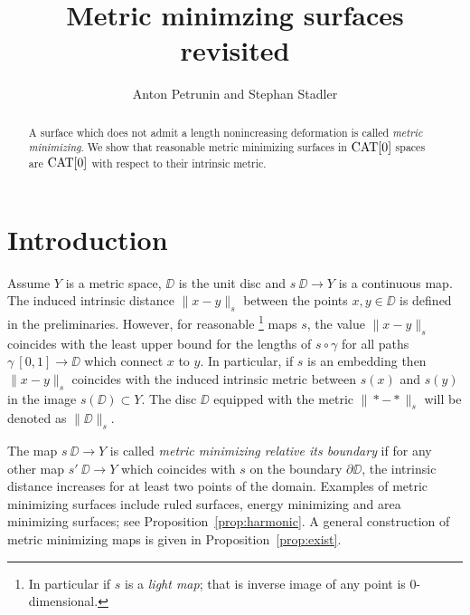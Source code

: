 \documentclass{article}
\begin{document}
\title{Metric minimzing surfaces revisited}
\author{Anton Petrunin and Stephan Stadler}


\date{}

\maketitle

\begin{abstract}
A surface which does not admit a length nonincreasing deformation is called \emph{metric minimizing}.
We show that reasonable metric minimizing surfaces in $\mathop{\rm CAT}\nolimits[0]$ spaces are $\mathop{\rm CAT}\nolimits[0]$ with respect to their intrinsic metric. 

\end{abstract}

\section{Introduction}


Assume $Y$ is a metric space, 
$\DD$ is the unit disc 
and $s\:\DD\to Y$ is a continuous map.
The induced intrinsic distance $\|x-y\|_s$ between the points $x,y\in\DD$ is defined in the preliminaries.
However, 
for reasonable%
\footnote{In particular if $s$ is a \emph{light map}; that is inverse image of any point is 0-dimensional.} 
maps $s$, 
the value $\|x-y\|_s$ coincides with the least upper bound for the lengths of $s\circ\gamma$ for all paths $\gamma\:[0,1]\to \DD$ which connect $x$ to $y$.
In particular, if $s$ is an embedding then $\|x-y\|_s$ coincides with the induced intrinsic metric between $s(x)$ and $s(y)$ in the image $s(\DD)\subset Y$.
The disc $\DD$ equipped with the metric $\|{*}-{*}\|_s$ will be denoted as $\|\DD\|_s$.

The map $s\:\DD\to Y$ is called \emph{metric minimizing relative its boundary} if for any other map $s'\:\DD\to Y$ which coincides with $s$ 
on the boundary $\partial \DD$, 
the intrinsic distance increases for at least two points of the domain.
Examples of metric minimizing surfaces include
ruled surfaces, energy minimizing and area minimizing surfaces; 
see Proposition~\ref{prop:harmonic}.
A general construction of metric minimizing maps is given in Proposition~\ref{prop:exist}.
\end{document}
